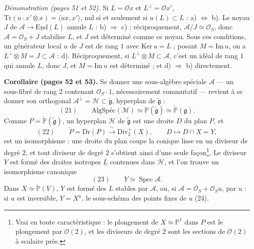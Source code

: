 \documentclass[11pt,a4paper]{article}
\begin{document}
\emph{Démonstration (pages 51 et 52).} Si $L = \mathcal{O}x$ et $L^{\perp} = \mathcal{O}x'$,
$\mathrm{Tr}(u \cdot x' \otimes x) = \langle ux, x' \rangle$, nul si et seulement si
$u(L) \subset L$ : a) $\Leftrightarrow$ b). Le noyau $J$ de
$\mathcal{A} \to \underline{\mathrm{End}}(L)$ annule $L$ : b) $\Rightarrow$ c) ; réciproquement,
$\mathcal{A}/J \simeq \mathcal{O}_S$, donc $\mathcal{A} = \mathcal{O}_S + J$ stabilise $L$, et $J$ est
déterminé comme ce noyau. Sous ces conditions, un générateur local $u$ de $J$
est de rang $1$ avec $\mathrm{Ker}\,u = L$ ; posant $M = \mathrm{Im}\,u$, on a
$L^{\perp} \otimes M = J \subset \mathcal{A}$ : d). Réciproquement, si
$L^{\perp} \otimes M \subset \mathcal{A}$, c'est un idéal de rang $1$ qui annule $L$, donc
$J$, et $M = \mathrm{Im}\,u$ est déterminé ; et d) $\Rightarrow$ b) directement.

\textbf{Corollaire (pages 52 et 53).} Se donner une sous-algèbre spéciale
$\mathcal{A}$ — un sous-fibré de rang $2$ contenant $\mathcal{O}_S\cdot 1$, nécessairement
commutatif — revient à se donner son orthogonal
$\mathcal{A}^{\perp} = \mathcal{H} \subset \widetilde{\mathfrak{g}}$, hyperplan de $\widetilde{\mathfrak{g}}$ :
\[
  (21) \qquad \text{AlgSpéc}(\mathcal{M}) \simeq \mathbb{P}(\widetilde{\mathfrak{g}}) \simeq
  \check{\mathbb{P}}(\mathfrak{g}) .
\]
Comme $P = \check{\mathbb{P}}(\widetilde{\mathfrak{g}})$, un hyperplan $\mathcal{H}$ de
$\widetilde{\mathfrak{g}}$ est une droite $D$ du plan $P$, et
\[
  (22) \qquad \check{P} = \mathrm{Dr}(P) \xrightarrow{\ \sim\ } \mathrm{Div}_2^{+}(X), \qquad D \longmapsto D \cap X = Y ,
\]
est un isomorphisme : une droite du plan coupe la conique lisse en un diviseur
de degré $2$, et tout diviseur de degré $2$ s'obtient ainsi d'une seule
façon\footnote{Vrai en toute caractéristique : le plongement de $X \simeq \mathbb{P}^1$
dans $P$ est le plongement par $\mathcal{O}(2)$, et les diviseurs de degré $2$ sont les
sections de $\mathcal{O}(2)$ à scalaire près.}. Le diviseur $Y$ est formé des droites
isotropes $\underline{L}$ contenues dans $\mathcal{H}$, et l'on trouve un isomorphisme
canonique
\[
  (23) \qquad Y \simeq \operatorname{Spec} \mathcal{A} .
\]
Dans $X \simeq \check{\mathbb{P}}(V)$, $Y$ est formé des $L$ stables par $\mathcal{A}$, ou, si
$\mathcal{A} = \mathcal{O}_S + \mathcal{O}_S u$, par $u$ : si $u$ est inversible, $Y = X^{u}$, le
sous-schéma des points fixes de $u$ (24).
\end{document}
